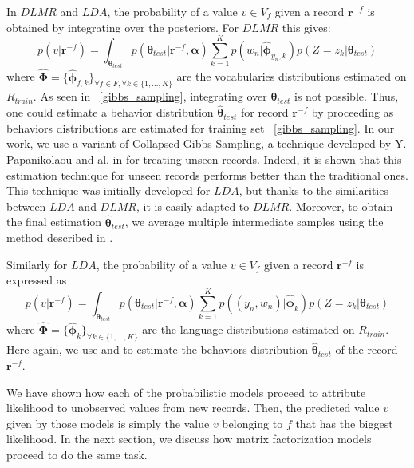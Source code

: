 In $DLMR$ and $LDA$, the probability of a value $v \in V_{f}$ given a record $\mathbf{r}^{-f}$ is obtained by integrating over the posteriors. For $DLMR$ this gives:
\begin{equation}
p(v|\mathbf{r}^{-f})=\int_{\boldsymbol{\theta}_{test} }p(\boldsymbol{\theta}_{test}|\mathbf{r}^{-f},\boldsymbol{\alpha })\sum_{k=1}^{K}p(w_{n}|\boldsymbol{\widehat{\phi}  }_{y_{n},k})p(Z=z_{k}|\boldsymbol{\theta }_{test})
\end{equation}
where $\boldsymbol{\widehat{\Phi }}=\{\boldsymbol{\widehat{\phi} }_{f,k}\}_{\forall f \in F, \forall k\in\{1,...,K\}}$ are the vocabularies distributions estimated on $R_{train}$. As seen in ~\ref{gibbs_sampling}, integrating over $\boldsymbol{\theta}_{test}$ is not possible. Thus, one could estimate a behavior distribution $\boldsymbol{\widehat{\theta}}_{test}$ for record $\mathbf{r}^{-f}$ by proceeding as behaviors distributions are estimated for training set ~\ref{gibbs_sampling}. In our work, we use a variant of Collapsed Gibbs Sampling, a technique developed by Y. Papanikolaou and al. in \cite{gibbsunseen} for treating unseen records. Indeed, it is shown that this estimation technique for unseen records performs better than the traditional ones. This technique was initially developed for $LDA$, but thanks to the similarities between $LDA$ and $DLMR$, it is easily adapted to $DLMR$. Moreover, to obtain the final estimation $\boldsymbol{\widehat{\theta}}_{test}$, we average multiple intermediate samples using the method described in \cite{gibbsaverage}.

Similarly for $LDA$, the probability of a value $v \in V_{f}$ given a record $\mathbf{r}^{-f}$ is expressed as
\begin{equation}
p(v|\mathbf{r}^{-f})=\int_{\boldsymbol{\theta}_{test} }p(\boldsymbol{\theta}_{test}|\mathbf{r}^{-f},\boldsymbol{\alpha })\sum_{k=1}^{K}p((y_{n},w_{n})|\boldsymbol{\widehat{\phi}  }_{k})p(Z=z_{k}|\boldsymbol{\theta }_{test})
\end{equation}
where $\boldsymbol{\widehat{\Phi }}=\{\boldsymbol{\widehat{\phi} }_{k}\}_{\forall k\in\{1,...,K\}}$ are the language distributions estimated on $R_{train}$. Here again, we use \cite{gibbsunseen} and \cite{gibbsaverage} to estimate the behaviors distribution $\boldsymbol{\widehat{\theta}}_{test}$ of the record $\mathbf{r}^{-f}$. \par

We have shown how each of the probabilistic models proceed to attribute likelihood to unobserved values from new records. Then, the predicted value $v$ given by those models is simply the value $v$ belonging to $f$ that has the biggest likelihood. In the next section, we discuss how matrix factorization models proceed to do the same task.

